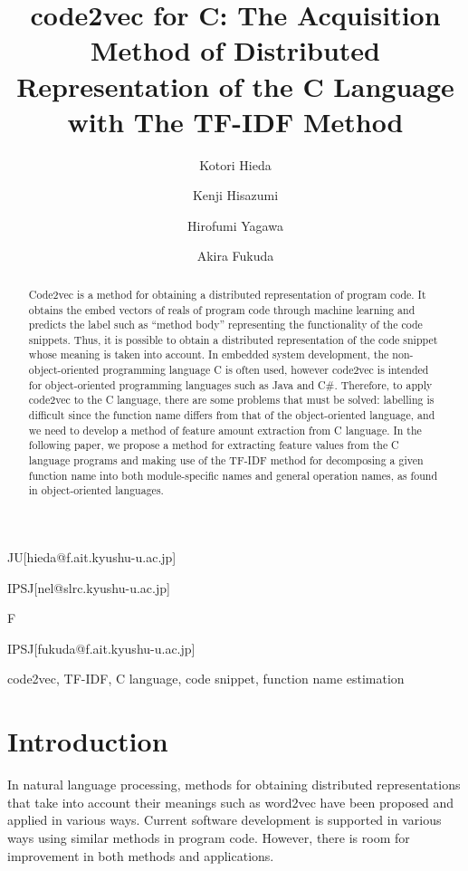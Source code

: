 \documentclass[JIP]{apris}
\begin{document}
\title{code2vec for C: The Acquisition Method of Distributed Representation of the C Language with The TF-IDF Method}


\author{Kotori Hieda}{JU}[hieda@f.ait.kyushu-u.ac.jp]
\author{Kenji Hisazumi}{IPSJ}[nel@slrc.kyushu-u.ac.jp]
\author{Hirofumi Yagawa}{F}
\author{Akira Fukuda}{IPSJ}[fukuda@f.ait.kyushu-u.ac.jp]


\begin{abstract}
Code2vec is a method for obtaining a distributed representation of program code. It obtains the embed vectors of reals of program code through machine learning and predicts the label such as ``method body'' representing the functionality of the code snippets. Thus, it is possible to obtain a distributed representation of the code snippet whose meaning is taken into account. In embedded system development, the non-object-oriented programming language C is often used, however code2vec is intended for object-oriented programming languages such as Java and C\#. Therefore, to apply code2vec to the C language, there are some problems that must be solved: labelling is difficult since the function name differs from that of the object-oriented language, and we need to develop a method of feature amount extraction from C language. In the following paper, we propose a method for extracting feature values from the C language programs and making use of the TF-IDF method for decomposing a given function name into both module-specific names and general operation names, as found in object-oriented languages.
\end{abstract}

\begin{keyword}
code2vec, TF-IDF, C language, code snippet, function name estimation
\end{keyword}

\maketitle

\section{Introduction}
In natural language processing, methods for obtaining distributed representations that take into account their meanings such as word2vec\cite{lian2015exploration} have been proposed and applied in various ways. Current software development is supported in various ways using similar methods in program code. However, there is room for improvement in both methods and applications. 
\end{document}
